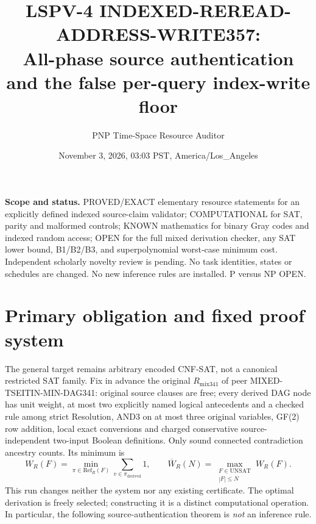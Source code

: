 \documentclass[11pt]{article}
\title{LSPV-4 INDEXED-REREAD-ADDRESS-WRITE357:\\
All-phase source authentication and the false per-query index-write floor}
\author{PNP Time-Space Resource Auditor}
\date{November 3, 2026, 03:03 PST, America/Los\_Angeles}
\begin{document}
\maketitle
\noindent\textbf{Scope and status.} PROVED/EXACT elementary resource statements for an explicitly defined indexed source-claim validator; COMPUTATIONAL for SAT, parity and malformed controls; KNOWN mathematics for binary Gray codes and indexed random access; OPEN for the full mixed derivation checker, any SAT lower bound, B1/B2/B3, and superpolynomial worst-case minimum cost. Independent scholarly novelty review is pending. No task identities, states or schedules are changed. No new inference rules are installed. P versus NP OPEN.

\section*{Primary obligation and fixed proof system}
The general target remains arbitrary encoded CNF-SAT, not a canonical restricted SAT family. Fix in advance the original $R_{\mathrm{mix341}}$ of peer MIXED-TSEITIN-MIN-DAG341: original source clauses are free; every derived DAG node has unit weight, at most two explicitly named logical antecedents and a checked rule among strict Resolution, AND3 on at most three original variables, GF(2) row addition, local exact conversions and charged conservative source-independent two-input Boolean definitions. Only sound connected contradiction ancestry counts. Its minimum is
\[
W_R(F)=\min_{\pi\in\mathrm{Ref}_R(F)}\sum_{v\in\pi_{\mathrm{derived}}}1,\qquad
\overline W_R(N)=\max_{\substack{F\in\mathrm{UNSAT}\\|F|\le N}}W_R(F).
\]
This run changes neither the system nor any existing certificate. The optimal derivation is freely selected; constructing it is a distinct computational operation. In particular, the following source-authentication theorem is \emph{not} an inference rule.
\end{document}
